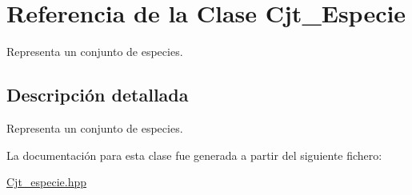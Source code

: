 \hypertarget{class_cjt___especie}{
\section{\-Referencia de la \-Clase \-Cjt\-\_\-\-Especie}
\label{class_cjt___especie}
}


\-Representa un conjunto de especies.  




\subsection{\-Descripción detallada}
\-Representa un conjunto de especies. 

\-La documentación para esta clase fue generada a partir del siguiente fichero\-:\begin{DoxyCompactItemize}
\item 
\hyperlink{_cjt__especie_8hpp}{\-Cjt\-\_\-especie.\-hpp}\end{DoxyCompactItemize}
